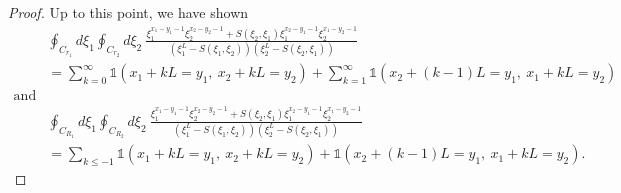 \documentclass[a4paper,11pt]{article}
\theoremstyle{definition}
\begin{document}
\begin{proof}
Up to this point, we have shown 
\begin{equation}
    \begin{split}
        &\oint_{C_{r_1}}d\xi_1\oint_{C_{r_2}}d\xi_2 \ \frac{\xi_1^{x_1-y_1-1}\xi_2^{x_2-y_2-1}+ S(\xi_2,\xi_1)\xi_1^{x_2-y_1-1}\xi_2^{x_1-y_2-1}}{\left( \xi_1^L-S(\xi_1,\xi_2) \right)\left( \xi_2^L-S(\xi_2,\xi_1) \right)} \\
        &= \sum_{k=0}^\infty \mathds{1}\left( x_1+kL=y_1,  \ x_2+kL=y_2 \right) + \sum_{k=1}^\infty\mathds{1}\left( x_2+(k-1)L=y_1,  \ x_1+kL=y_2 \right) \\ \text{and}\\
        &\oint_{C_{R_1}}d\xi_1\oint_{C_{R_2}}d\xi_2 \ \frac{\xi_1^{x_1-y_1-1}\xi_2^{x_2-y_2-1}+ S(\xi_2,\xi_1)\xi_1^{x_2-y_1-1}\xi_2^{x_1-y_2-1}}{\left( \xi_1^L-S(\xi_1,\xi_2) \right)\left( \xi_2^L-S(\xi_2,\xi_1) \right)}\\
        &= \sum_{k\leq -1} \mathds{1}\left( x_1+kL=y_1,  \ x_2+kL=y_2 \right) + \mathds{1}\left( x_2+(k-1)L=y_1,  \ x_1+kL=y_2 \right).
    \end{split}
\end{equation}


\end{proof}
\end{document}
